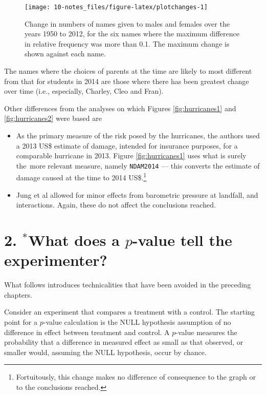 \documentclass[
  10pt,
  b5paper]{book}
\providecommand{\tightlist}{%
  \setlength{\itemsep}{0pt}\setlength{\parskip}{0pt}}
\begin{document}
\begin{figure}

{\centering \texttt{[image: 10-notes\_files/figure-latex/plotchanges-1]} 

}

\caption{Change in numbers of names given to males and females
over the years 1950 to 2012, for the six names where the 
maximum difference in relative frequency was more than 0.1.
The maximum change is shown against each name.}\label{fig:plotchanges}
\end{figure}

The names where the choices of parents at the time are likely to
most different from that for students in 2014 are those where
there has been greatest change over time (i.e., especially,
Charley, Cleo and Fran).

\enlargethispage{21pt}

Other differences from the analyses on which Figures
\ref{fig:hurricanes1} and \ref{fig:hurricanes2} were based
are

\begin{itemize}
\tightlist
\item
  As the primary measure of the risk posed by the hurricanes, the
  authors used a 2013 US\$ estimate of damage, intended for
  insurance purposes, for a comparable hurricane in 2013. Figure
  \ref{fig:hurricanes1} uses what is surely the~more relevant
  measure, namely \texttt{NDAM2014} --- this converts the estimate of
  damage caused at the time to 2014 US\$.\footnote{Fortuitously, this
    change makes no difference of consequence to the graph or to
    the conclusions reached.}
\item
  Jung et al allowed for minor effects from barometric pressure
  at landfall, and interactions. Again, these do not affect
  the conclusions reached.
\end{itemize}

\hypertarget{pval}{%
\section*{\texorpdfstring{2. \(^*\)What does a \(p\)-value tell the experimenter?}{2. \^{}*What does a p-value tell the experimenter?}}\label{pval}}

What follows introduces technicalities that have been avoided in the
preceding chapters.

Consider an experiment that compares a treatment with a control.
The starting point for a \(p\)-value calculation is the NULL
hypothesis assumption of no difference in effect between
treatment and control.
A \(p\)-value measures the probability that a difference in
measured effect as small as that observed, or smaller would,
assuming the NULL hypothesis, occur by chance.
\end{document}
